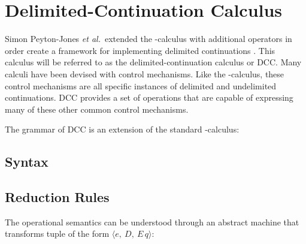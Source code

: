 \section{Delimited-Continuation Calculus}

  Simon Peyton-Jones \textit{et al.}\ extended the \lam-calculus with additional operators in order create a framework for implementing delimited continuations \cite{JonesDS07}. This calculus will be referred to as the delimited-continuation calculus or DCC. Many calculi have been devised with control mechanisms. Like the \lmu-calculus, these control mechanisms are all specific instances of delimited and undelimited continuations. DCC provides a set of operations that are capable of expressing many of these other common control mechanisms.

  The grammar of DCC is an extension of the standard \lam-calculus:

  \subsection{Syntax}
  \begin{figure}[!h]
  \end{figure}

  \subsection{Reduction Rules}
  The operational semantics can be understood through an abstract machine that transforms tuple of the form $\langle e,\ D,\ E\, q \rangle$:

